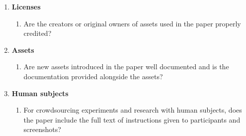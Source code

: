 \documentclass{article}
\begin{document}
\begin{enumerate}
\item {\bf Licenses}
    \begin{enumerate}
        \item Are the creators or original owners of assets used in the paper properly credited?
    \end{enumerate}

\item {\bf Assets}
    \begin{enumerate}
        \item Are new assets introduced in the paper well documented and is the documentation provided alongside the assets?
    \end{enumerate}

\item {\bf Human subjects}
    \begin{enumerate}
        \item For crowdsourcing experiments and research with human subjects, does the paper include the full text of instructions given to participants and screenshots?
    \end{enumerate}

\end{enumerate}
\end{document}

